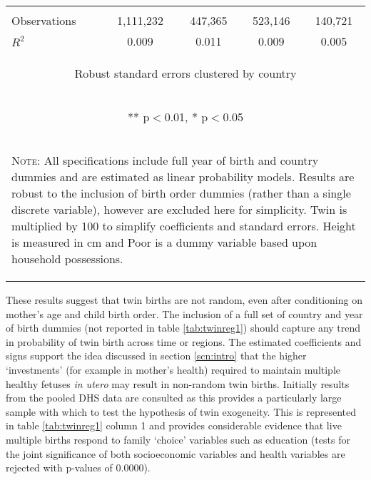\documentclass{article}[11pt,subeqn]
\begin{document}
\begin{spacing}{1.5}
\begin{table}[ht]
\begin{center}
\begin{tabular}{lcccc}
\vspace{4pt} & \begin{footnotesize}\end{footnotesize} & \begin{footnotesize}\end{footnotesize} & \begin{footnotesize}\end{footnotesize} & \begin{footnotesize}\end{footnotesize} \\
Observations & 1,111,232 & 447,365 & 523,146 & 140,721 \\
 $R^2$ & 0.009 & 0.011 & 0.009 & 0.005 \\ \midrule
\multicolumn{5}{c}{\begin{footnotesize} Robust standard errors clustered by country \end{footnotesize}} \\
\multicolumn{5}{c}{\begin{footnotesize} ** p$<$0.01, * p$<$0.05 \end{footnotesize}} \\
\bottomrule
\multicolumn{5}{p{10cm}}{\setstretch{0.9}\begin{footnotesize}\textsc{Note:} All specifications include full year of birth and country
dummies and are estimated as linear probability models.  Results are robust to the inclusion of birth order dummies (rather than a single discrete 
variable), however are excluded here for simplicity.  Twin is multiplied by 100 to simplify coefficients and standard errors.  Height is measured
in cm and Poor is a dummy variable based upon household possessions.\end{footnotesize}}\\
\end{tabular}
\end{center}
\end{table}

These results suggest that twin births are not random, even after conditioning on mother's age and child birth order.  The
inclusion of a full set of country and year of birth dummies (not reported in table \ref{tab:twinreg1}) should capture any trend in
probability of twin birth across time or regions.  The estimated coefficients and signs support the idea discussed in section \ref{scn:intro}
that the higher `investments' (for example in mother's health) required to maintain multiple healthy fetuses \emph{in utero} may result in 
non-random twin births. 
Initially results from the pooled DHS data are consulted as this provides a particularly large sample with which to test the hypothesis of
twin exogeneity.  This is represented in table \ref{tab:twinreg1} column 1 and provides considerable evidence that live multiple
births respond to family `choice' variables such as education (tests for the joint significance of both socioeconomic variables and health
variables are rejected with p-values of 0.0000).


\end{spacing}
\end{document}
